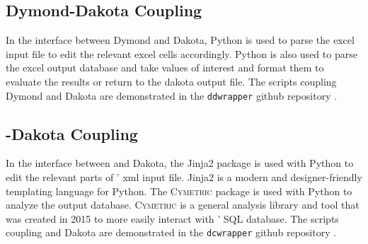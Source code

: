 \subsection{Dymond-Dakota Coupling}
In the interface between Dymond and Dakota, Python is used 
to parse the excel input file to edit the relevant 
excel cells accordingly. 
Python is also used to parse the excel output database and take 
values of interest and format them to evaluate the results 
or return to the dakota output file.
The scripts coupling Dymond and Dakota are demonstrated in the 
\texttt{ddwrapper} github repository \cite{ddwrapper_doi_2019}.

\subsection{\Cyclus-Dakota Coupling}
In the interface between \Cyclus and Dakota, 
the Jinja2 \cite{ronacher_welcome_2018} package is used 
with Python to edit the relevant parts of \Cyclus' xml input file. 
Jinja2 is a modern and designer-friendly templating 
language for Python. 
The \textsc{Cymetric} \cite{scopatz_cymetric_2015} package is used with Python 
to analyze the \Cyclus output database. 
\textsc{Cymetric} is a general analysis library and tool that was 
created in 2015 to more easily interact with \Cyclus' SQL 
database. 
The scripts coupling \Cyclus and Dakota are demonstrated in the 
\texttt{dcwrapper} github repository \cite{ddwrapper_doi_2019}.




